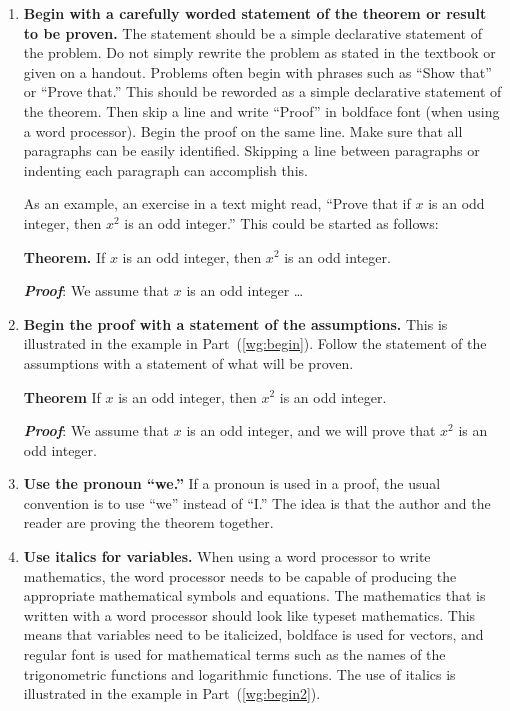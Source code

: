 \begin{enumerate}
\item \textbf{Begin with a carefully worded statement of the theorem or result to be proven.}
\label{wg:begin} 
The statement should be a simple declarative statement of the problem. Do not simply rewrite the problem as stated in the textbook or given on a handout.  Problems often begin with phrases such as ``Show that'' or ``Prove that.''  This should be reworded as a simple declarative statement of the theorem.  Then skip a line and write ``Proof''  in boldface font (when using a word processor).  Begin the proof on the same line.  Make sure that all paragraphs can be easily identified.  Skipping a line between paragraphs or indenting each paragraph can accomplish this.

As an example, an exercise in a text might read, ``Prove that if $x$  is an odd integer, then $x^2$ is an odd integer.''  This could be started as follows:

\textbf{Theorem.} 
If  $x$  is an odd integer, then $x^2$ is an odd integer.

\textbf{\emph{Proof}}:  We assume that  $x$  is an odd integer  \ldots

\newpage
\item \textbf{Begin the proof with a statement of the assumptions.}  \label{wg:begin2} 
This is illustrated in the example in Part~(\ref{wg:begin}).  Follow the statement of the assumptions with a statement of what will be proven.

\textbf{Theorem}
If  $x$  is an odd integer, then $x^2$ is an odd integer.

\textbf{\emph{Proof}}:  We assume that  $x$  is an odd integer, and we will prove that $x^2$ is an odd integer.

\item \textbf{Use the pronoun ``we.''}
If a pronoun is used in a proof, the usual convention is to use ``we'' instead of ``I.''  The idea is that the author and the reader are proving the theorem together.

\item \textbf{Use italics for variables.}
When using a word processor to write mathematics, the word processor needs to be capable of producing the appropriate mathematical symbols and equations.  The mathematics that is written with a word processor should look like typeset mathematics.  This means that variables need to be italicized, boldface is used for vectors, and regular font is used for mathematical terms such as the names of the trigonometric functions and logarithmic functions.  The use of italics is illustrated in the example in Part~(\ref{wg:begin2}).


\end{enumerate}
